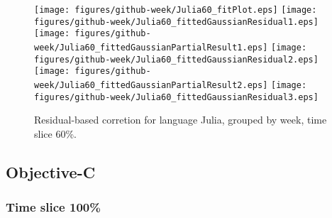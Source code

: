 \begin{figure}[t]
\centering
{}
{\texttt{[image: figures/github-week/Julia60\_fitPlot.eps]}}
{\texttt{[image: figures/github-week/Julia60\_fittedGaussianResidual1.eps]}}
{\texttt{[image: figures/github-week/Julia60\_fittedGaussianPartialResult1.eps]}}
{\texttt{[image: figures/github-week/Julia60\_fittedGaussianResidual2.eps]}}
{\texttt{[image: figures/github-week/Julia60\_fittedGaussianPartialResult2.eps]}}
{\texttt{[image: figures/github-week/Julia60\_fittedGaussianResidual3.eps]}}
\caption{Residual-based corretion for language Julia, grouped by week, time slice 60\%.}
\end{figure}


\FloatBarrier


\subsection{Objective-C}

\subsubsection{Time slice 100\%}

